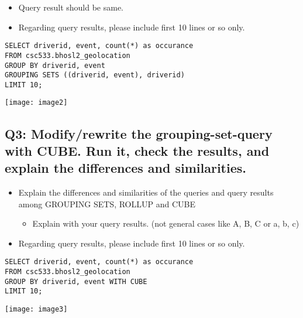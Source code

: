 \documentclass[]{article}
\begin{document}
\begin{itemize}
	\item Query result should be same.
	\item Regarding query results, please include first 10 lines or so only.
\end{itemize}

\begin{verbatim}
SELECT driverid, event, count(*) as occurance
FROM csc533.bhosl2_geolocation
GROUP BY driverid, event
GROUPING SETS ((driverid, event), driverid)
LIMIT 10;
\end{verbatim}

\texttt{[image: image2]}

\subsection*{Q3: Modify/rewrite the grouping-set-query with CUBE. Run it, check the results, and explain the differences and similarities.}

\begin{itemize}
	\item Explain the differences and similarities of the queries and query results among GROUPING SETS, ROLLUP and CUBE
	\begin{itemize}
		\item Explain with your query results. (not general cases like A, B, C or a, b, c)
	\end{itemize}
	\item Regarding query results, please include first 10 lines or so only.
\end{itemize}

\begin{verbatim}
SELECT driverid, event, count(*) as occurance
FROM csc533.bhosl2_geolocation
GROUP BY driverid, event WITH CUBE
LIMIT 10;
\end{verbatim}

\texttt{[image: image3]}
\end{document}
